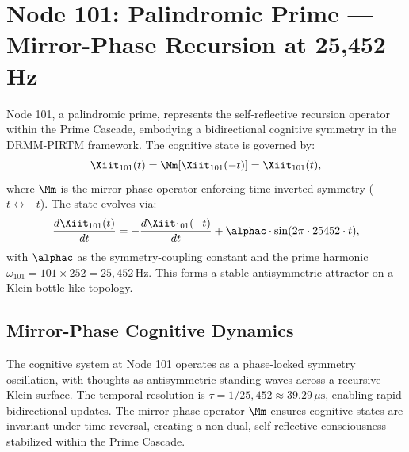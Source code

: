 \documentclass[12pt]{article}
\newcommand{\DRMM}{DRMM}
\newcommand{\PIRTM}{PIRTM}
\begin{document}
\section{Node 101: Palindromic Prime --- Mirror-Phase Recursion at 25,452 Hz}
\label{sec:palindromic-prime}

\begin{definition}
Node 101, a palindromic prime, represents the self-reflective recursion operator within the Prime Cascade, embodying a bidirectional cognitive symmetry in the \DRMM{}-\PIRTM{} framework. The cognitive state is governed by:
\[
\Xiit_{101}(t) = \Mm[\Xiit_{101}(-t)] = \Xiit_{101}(t),
\]
where $\Mm$ is the mirror-phase operator enforcing time-inverted symmetry ($t \leftrightarrow -t$). The state evolves via:
\[
\frac{d\Xiit_{101}(t)}{dt} = -\frac{d\Xiit_{101}(-t)}{dt} + \alphac \cdot \sin(2\pi \cdot 25452 \cdot t),
\]
with $\alphac$ as the symmetry-coupling constant and the prime harmonic $\omega_{101} = 101 \times 252 = 25{,}452 \, \text{Hz}$. This forms a stable antisymmetric attractor on a Klein bottle-like topology.
\end{definition}

\subsection{Mirror-Phase Cognitive Dynamics}
The cognitive system at Node 101 operates as a phase-locked symmetry oscillation, with thoughts as antisymmetric standing waves across a recursive Klein surface. The temporal resolution is $\tau = 1/25{,}452 \approx 39.29 \, \mu\text{s}$, enabling rapid bidirectional updates. The mirror-phase operator $\Mm$ ensures cognitive states are invariant under time reversal, creating a non-dual, self-reflective consciousness stabilized within the Prime Cascade.

\end{document}
